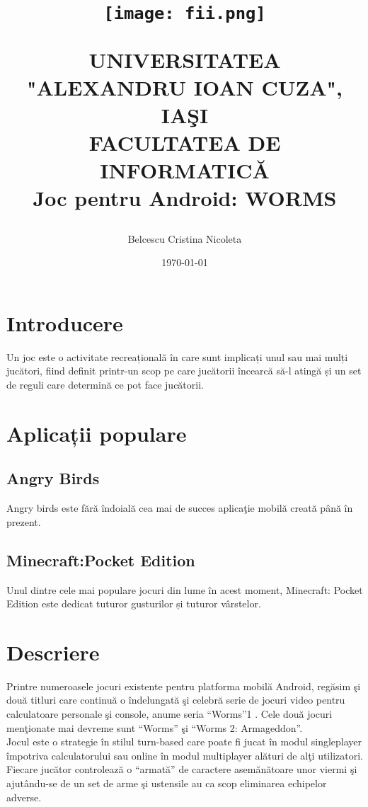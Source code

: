 \documentclass[a4paper,12pt]{article}
\begin{document}
\begin{titlepage}
\title{
	{\begin{center}
		\texttt{[image: fii.png]}
	\end{center}}
	{\color{blue}UNIVERSITATEA "ALEXANDRU IOAN CUZA", IAŞI}\\
	{FACULTATEA DE INFORMATICĂ}\\
 	{\textbf{Joc pentru Android: WORMS}}
}
\author{Belcescu Cristina Nicoleta}
\date{\today}
\maketitle
\end{titlepage}


\renewcommand{\contentsname}{Cuprins}
\tableofcontents
\newpage

\section{Introducere}
Un joc este o activitate recreațională în care sunt implicați unul sau mai mulți jucători, 
fiind definit printr-un scop pe care jucătorii încearcă să-l atingă și un set de reguli care 
determină ce pot face jucătorii.
\section{Aplicații populare}
	\subsection{Angry Birds}
	Angry birds este fără îndoială cea mai de succes aplicaţie mobilă creată până în prezent.
	\subsection{Minecraft:Pocket Edition}
	Unul dintre cele mai populare jocuri din lume în acest moment, Minecraft: Pocket Edition este dedicat tuturor gusturilor și tuturor vârstelor.
	
\section{Descriere}

Printre numeroasele jocuri existente pentru platforma mobilă Android, regăsim şi două
titluri care continuă o îndelungată şi celebră serie de jocuri video pentru calculatoare personale
şi console, anume seria “Worms”1
. Cele două jocuri menţionate mai devreme sunt “Worms” şi
“Worms 2: Armageddon”.\\
Jocul este o strategie în stilul turn-based care poate fi jucat în modul singleplayer
împotriva calculatorului sau online în modul multiplayer alături de alţi utilizatori. Fiecare
jucător controlează o “armată” de caractere asemănătoare unor viermi şi ajutându-se de un set
de arme şi ustensile au ca scop eliminarea echipelor adverse.
\end{document}
